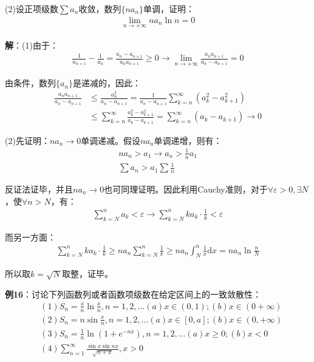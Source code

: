 \documentclass{ctexart}
\let\oldtextbf\textbf
\renewcommand{\textbf}[1]{\textcolor{brown!50!red}{\oldtextbf{#1}}}
\begin{document}
(2)设正项级数$\sum a_n$收敛，数列$\{n a_n\}$单调，证明：
\begin{align*}
    \lim_{n\to+\infty}na_n\ln n=0
\end{align*}

\textbf{\color{brown!50!red}解}：(1)由于：
\begin{align*}
    \frac{1}{a_{n+1}}-\frac{1}{a_n}=\frac{a_n-a_{n+1}}{a_na_{n+1}}\geq 0\to\lim_{n\to+\infty}
\frac{a_na_{n+1}}{a_n-a_{n+1}}=0   
\end{align*}

由条件，数列$\{a_n\}$是递减的，因此：
\begin{align*}
    \frac{a_na_{n+1}}{a_n-a_{n+1}}&\leq\frac{a_n^2}{a_n-a_{n+1}}=\frac{1}{a_n-a_{n+1}}
\sum_{k=n}^\infty (a_k^2-a_{k+1}^2)\\
&\leq\sum_{k=n}^\infty\frac{a_k^2-a_{k+1}^2}{a_k-a_{k+1}}=\sum_{k=n}^\infty(a_k-a_{k+1})\to 0
\end{align*}

(2)先证明：$na_n\to 0$单调递减。假设$na_n$单调递增，则有：
\begin{align*}
  na_n>a_1\to a_n>\frac{1}{n}a_1\\
\sum a_n>a_1\sum\frac{1}{n}  
\end{align*}

反证法证毕，并且$na_n\to 0$也可同理证明。因此利用Cauchy准则，对于$\forall \varepsilon>0,\exists N$，使$\forall n>N$，有：
\begin{align*}
  \sum_{k=N}^n a_k<\varepsilon \to\sum_{k=N}^nka_k\cdot\frac{1}{k}<\varepsilon 
\end{align*}

而另一方面：
\begin{align*}
\sum_{k=N}^nka_k\cdot\frac{1}{k}\geq na_n\sum_{k=N}^n\frac{1}{k}\geq na_n\int_N^n\frac{1}{x}\mathrm{d}x=na_n\ln\frac{n}{N}   
\end{align*}

所以取$k=\sqrt{N}$取整，证毕。


\textbf{\color{brown!50!red}例16}：讨论下列函数列或者函数项级数在给定区间上的一致敛散性：
\begin{align*} 
 &(1)S_n=\frac{x}{n}\ln\frac{x}{n},n=1,2,... (a)x\in(0,1);(b)x\in(0+\infty)\\
  &(2)S_n=n\sin\frac{x}{n},n=1,2,... (a)x\in[0,a];(b)x\in(0,+\infty)\\
&(3)S_n=\frac{1}{n}\ln(1+e^{-nx})  ,n=1,2,...(a)x\geq 0;(b)x<0\\
&(4)\sum_{n=1}^\infty\frac{\sin x\sin nx}{\sqrt{n+x} },x>0 
\end{align*}
\end{document}

